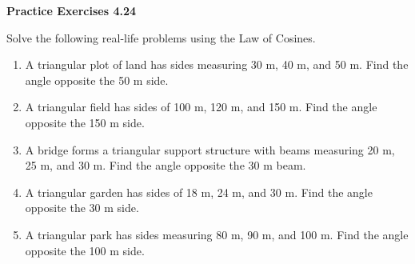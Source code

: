 \vspace{0.3ex}
\noindent\textbf{Practice Exercises 4.24}

\vspace{0.2ex}

Solve the following real-life problems using the Law of Cosines.

\begin{enumerate}
    \item A triangular plot of land has sides measuring 30 m, 40 m, and 50 m. Find the angle opposite the 50 m side.
    \item A triangular field has sides of 100 m, 120 m, and 150 m. Find the angle opposite the 150 m side.
    \item A bridge forms a triangular support structure with beams measuring 20 m, 25 m, and 30 m. Find the angle opposite the 30 m beam.
    \item A triangular garden has sides of 18 m, 24 m, and 30 m. Find the angle opposite the 30 m side.
    \item A triangular park has sides measuring 80 m, 90 m, and 100 m. Find the angle opposite the 100 m side.
\end{enumerate}

